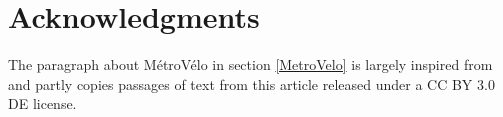 \documentclass{article}
\begin{document}
\section*{Acknowledgments}
\label{sec:acknowledgments}
The paragraph about MétroVélo in section \ref{MetroVelo} is largely inspired from \cite{bonvoisinOpennessSupportiveParadigm2013} and partly copies passages of text from this article released under a CC BY 3.0 DE license.



\end{document}
